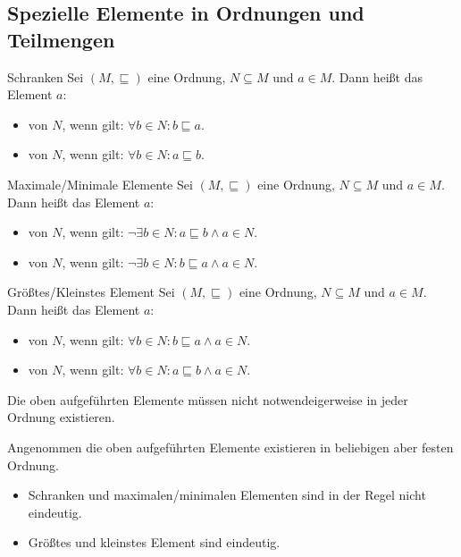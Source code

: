 \documentclass{scrartcl}
\begin{document}
\subsection{Spezielle Elemente in Ordnungen und Teilmengen}

\begin{definition}{Schranken}
Sei $(M, ⊑)$ eine Ordnung, $N ⊆ M$ und $a ∈ M$.
Dann heißt das Element $a$:
\begin{itemize}
\item {} von $N$, wenn gilt: $∀ b ∈ N: b ⊑ a$.
\item {} von $N$, wenn gilt: $∀ b ∈ N: a ⊑ b$.
\end{itemize}
\end{definition}

\begin{definition}{Maximale/Minimale Elemente}
Sei $(M, ⊑)$ eine Ordnung, $N ⊆ M$ und $a ∈ M$.
Dann heißt das Element $a$:
\begin{itemize}
\item {} von $N$, wenn gilt: $¬∃ b ∈ N: a ⊑ b ∧ a ∈ N$.
\item {} von $N$, wenn gilt: $¬∃ b ∈ N: b ⊑ a ∧ a ∈ N$.
\end{itemize}
\end{definition}

\begin{definition}{Größtes/Kleinstes Element}
Sei $(M, ⊑)$ eine Ordnung, $N ⊆ M$ und $a ∈ M$.
Dann heißt das Element $a$:
\begin{itemize}
\item {} von $N$, wenn gilt: $∀ b ∈ N: b ⊑ a ∧ a ∈ N$.
\item {} von $N$, wenn gilt: $∀ b ∈ N: a ⊑ b ∧ a ∈ N$.
\end{itemize}
\end{definition}

\begin{remark}
Die oben aufgeführten Elemente müssen nicht notwendeigerweise in jeder Ordnung
existieren.
\end{remark}

\begin{remark}
Angenommen die oben aufgeführten Elemente existieren in beliebigen aber festen
Ordnung.
\begin{itemize}
\item Schranken und maximalen/minimalen Elementen sind in der Regel nicht eindeutig.
\item Größtes und kleinstes Element sind eindeutig.
\end{itemize}
\end{remark}
\end{document}

